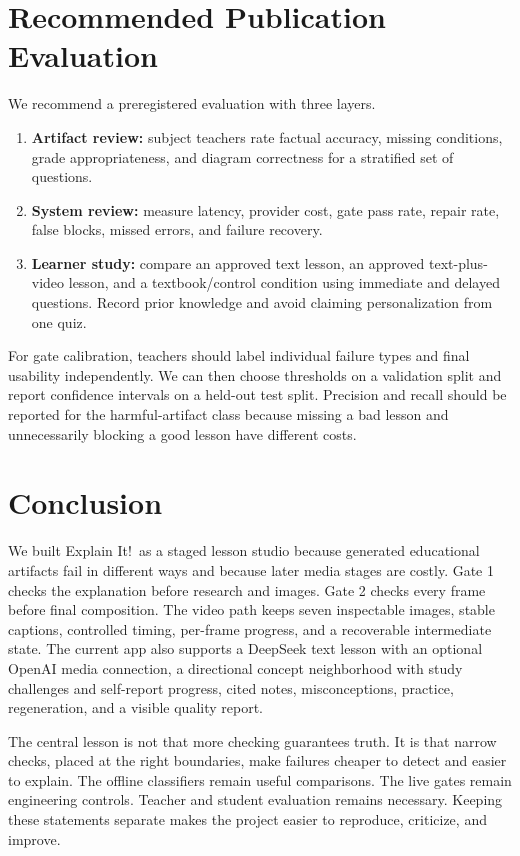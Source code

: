\documentclass[11pt]{article}
\newcommand{\product}{Explain It!}
\theoremstyle{plain}
\theoremstyle{definition}
\begin{document}
\section{Recommended Publication Evaluation}

We recommend a preregistered evaluation with three layers.
\begin{enumerate}
  \item \textbf{Artifact review:} subject teachers rate factual accuracy, missing conditions, grade appropriateness, and diagram correctness for a stratified set of questions.
  \item \textbf{System review:} measure latency, provider cost, gate pass rate, repair rate, false blocks, missed errors, and failure recovery.
  \item \textbf{Learner study:} compare an approved text lesson, an approved text-plus-video lesson, and a textbook/control condition using immediate and delayed questions. Record prior knowledge and avoid claiming personalization from one quiz.
\end{enumerate}

For gate calibration, teachers should label individual failure types and final usability independently. We can then choose thresholds on a validation split and report confidence intervals on a held-out test split. Precision and recall should be reported for the harmful-artifact class because missing a bad lesson and unnecessarily blocking a good lesson have different costs.

\section{Conclusion}

We built \product\ as a staged lesson studio because generated educational artifacts fail in different ways and because later media stages are costly. Gate 1 checks the explanation before research and images. Gate 2 checks every frame before final composition. The video path keeps seven inspectable images, stable captions, controlled timing, per-frame progress, and a recoverable intermediate state. The current app also supports a DeepSeek text lesson with an optional OpenAI media connection, a directional concept neighborhood with study challenges and self-report progress, cited notes, misconceptions, practice, regeneration, and a visible quality report.

The central lesson is not that more checking guarantees truth. It is that narrow checks, placed at the right boundaries, make failures cheaper to detect and easier to explain. The offline classifiers remain useful comparisons. The live gates remain engineering controls. Teacher and student evaluation remains necessary. Keeping these statements separate makes the project easier to reproduce, criticize, and improve.
\end{document}
